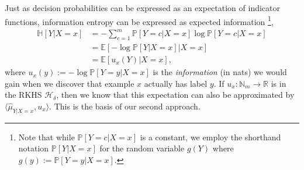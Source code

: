 \documentclass{article}
\begin{document}
		Just as decision probabilities can be expressed as an expectation of indicator functions, information entropy can be expressed as expected information \footnote{Note that while $\mathbb{P}[Y = c | X = x]$ is a constant, we employ the shorthand notation $\mathbb{P}[Y| X = x]$ for the random variable $g(Y)$ where $g(y) := \mathbb{P}[Y = y | X = x]$.},
		\begin{equation}
		\begin{aligned}
		\mathbb{H}[Y | X = x] &= - \sum_{c = 1}^{m} \mathbb{P}[Y = c| X = x] \log{\mathbb{P}[Y = c | X = x]} \\
		&= \mathbb{E}[- \log{\mathbb{P}[Y | X = x]} | X = x] \\
		&= \mathbb{E}[u_{x}(Y) | X = x],
		\end{aligned}
		\end{equation}
		where $u_{x}(y) := - \log{\mathbb{P}[Y = y | X = x]}$ is the \textit{information} (in nats) we would gain when we discover that example $x$ actually has label $y$. If $u_{x} : \mathbb{N}_{m} \to \mathbb{R}$ is in the RKHS $\mathcal{H}_{\delta}$, then we know that this expectation can also be approximated by $\langle \hat{\mu}_{Y | X = x}, u_{x} \rangle$. This is the basis of our second approach.
		
\end{document}

